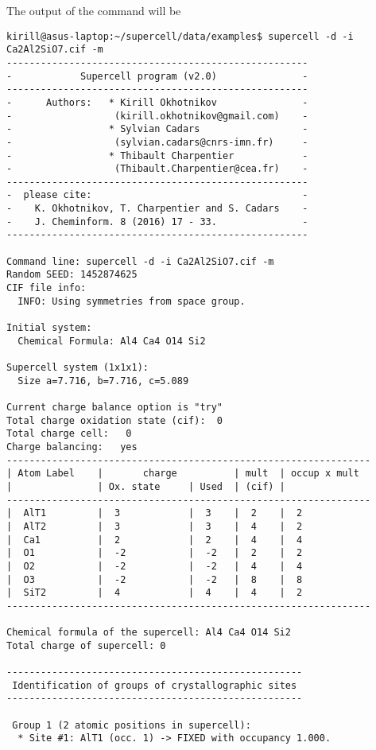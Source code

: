 \documentclass[a4paper,10pt]{article}
\begin{document}
The output of the command will be
\begin{verbatim}
kirill@asus-laptop:~/supercell/data/examples$ supercell -d -i Ca2Al2SiO7.cif -m 
-----------------------------------------------------
-            Supercell program (v2.0)               -
-----------------------------------------------------
-      Authors:   * Kirill Okhotnikov               -
-                  (kirill.okhotnikov@gmail.com)    -
-                 * Sylvian Cadars                  -
-                  (sylvian.cadars@cnrs-imn.fr)     -
-                 * Thibault Charpentier            -
-                  (Thibault.Charpentier@cea.fr)    -
-----------------------------------------------------
-  please cite:                                     -
-    K. Okhotnikov, T. Charpentier and S. Cadars    -
-    J. Cheminform. 8 (2016) 17 - 33.               -
-----------------------------------------------------

Command line: supercell -d -i Ca2Al2SiO7.cif -m 
Random SEED: 1452874625
CIF file info: 
  INFO: Using symmetries from space group.
  
Initial system:
  Chemical Formula: Al4 Ca4 O14 Si2

Supercell system (1x1x1):
  Size a=7.716, b=7.716, c=5.089

Current charge balance option is "try"
Total charge oxidation state (cif):  0
Total charge cell:   0
Charge balancing:   yes
----------------------------------------------------------------
| Atom Label    |       charge          | mult  | occup x mult
|               | Ox. state     | Used  | (cif) |                
----------------------------------------------------------------
|  AlT1         |  3            |  3    |  2    |  2
|  AlT2         |  3            |  3    |  4    |  2
|  Ca1          |  2            |  2    |  4    |  4
|  O1           |  -2           |  -2   |  2    |  2
|  O2           |  -2           |  -2   |  4    |  4
|  O3           |  -2           |  -2   |  8    |  8
|  SiT2         |  4            |  4    |  4    |  2
----------------------------------------------------------------

Chemical formula of the supercell: Al4 Ca4 O14 Si2
Total charge of supercell: 0

----------------------------------------------------
 Identification of groups of crystallographic sites 
----------------------------------------------------

 Group 1 (2 atomic positions in supercell):
  * Site #1: AlT1 (occ. 1) -> FIXED with occupancy 1.000.


\end{verbatim}
\end{document}
